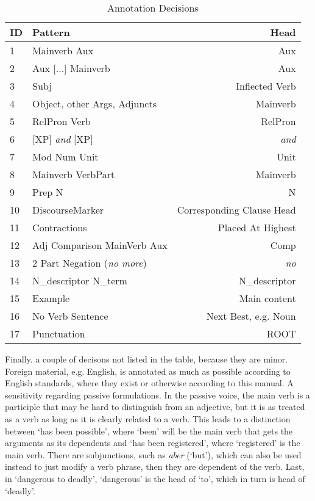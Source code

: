 \documentclass[11pt,letterpaper, covington]{article}
\begin{document}
 \begin{table}
\center
\begin{tabular}{ | l | l | r | }
   \hline
   \textbf{ID} & \textbf{Pattern} & \textbf{Head} \\ \hline
   1 & Mainverb Aux & Aux \\
   2 & Aux [...] Mainverb & Aux  \\ 
   3 & Subj & Inflected Verb  \\
   4 & Object, other Args, Adjuncts & Mainverb \\
   5 & RelPron Verb & RelPron \\
   6 & [XP] \emph{and} [XP] & \emph{and} \\
   7 & Mod Num Unit & Unit  \\
   8 & Mainverb VerbPart & Mainverb \\
   9 & Prep N &  N \\
   10 & DiscourseMarker & Corresponding Clause Head \\
   11 & Contractions & Placed At Highest \\
   12 & Adj Comparison MainVerb Aux & Comp \\
   13 & 2 Part Negation (\emph{no more}) & \emph{no}  \\
   14 & N\_descriptor N\_term & N\_descriptor \\
   15 & Example & Main content \\
   16 & No Verb Sentence & Next Best, e.g. Noun \\
   17 & Punctuation & ROOT\\ \hline
\end{tabular}
\caption{Annotation Decisions}
\label{tab:dec}
\end{table}

Finally. a couple of decisons not listed in the table, because they are minor. Foreign material, e.g. English, is annotated as much as possible according to English standards, where they exist or otherwise according to this manual. A sensitivity regarding passive formulations. In the passive voice, the main verb is a participle that may be hard to distinguish from an adjective, but it is as treated as a verb as long as it is clearly related to a verb. This leads to a distinction between `has been possible', where `been' will be the main verb that gets the arguments as its dependents and `has been registered', where 	`registered' is the main verb. There are subjunctions, such as \emph{aber} (`but'), which can also be used instead to just modify a verb phrase, then they are dependent of the verb. Last, in `dangerous to deadly', `dangerous' is the head of `to', which in turn is head of `deadly'. 
\end{document}
